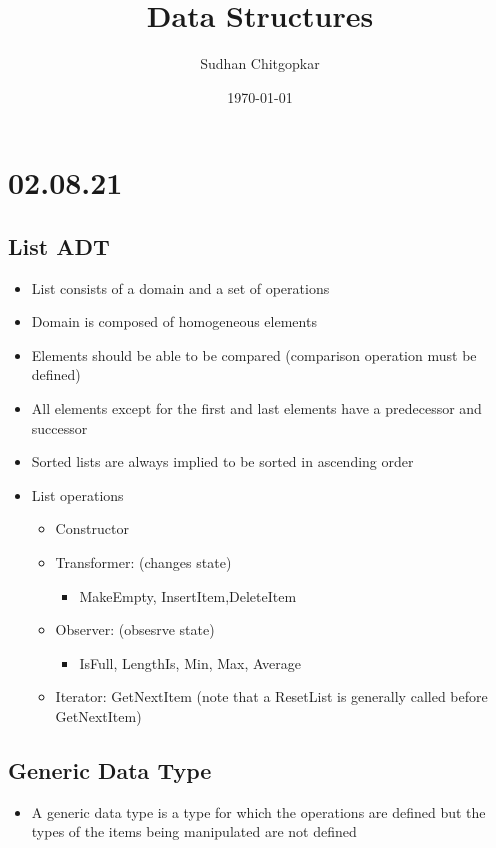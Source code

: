 \documentclass[11pt]{article}
\author{Sudhan Chitgopkar}
\date{\today}
\title{Data Structures}
\begin{document}
\maketitle
\section*{02.08.21}
\label{sec:orgb3455fa}
\subsection*{List ADT}
\label{sec:org5187d7d}
\begin{itemize}
\item List consists of a domain and a set of operations
\item Domain is composed of homogeneous elements
\item Elements should be able to be compared (comparison operation must be defined)
\item All elements except for the first and last elements have a predecessor and successor
\item Sorted lists are always implied to be sorted in ascending order
\item List operations
\begin{itemize}
\item Constructor
\item Transformer: (changes state)
\begin{itemize}
\item MakeEmpty, InsertItem,DeleteItem
\end{itemize}
\item Observer: (obsesrve state)
\begin{itemize}
\item IsFull, LengthIs, Min, Max, Average
\end{itemize}
\item Iterator: GetNextItem (note that a ResetList is generally called before GetNextItem)
\end{itemize}
\end{itemize}
\subsection*{Generic Data Type}
\label{sec:org32ef100}
\begin{itemize}
\item A generic data type is a type for which the operations are defined but the types of the items being manipulated are not defined
\end{itemize}
\end{document}

